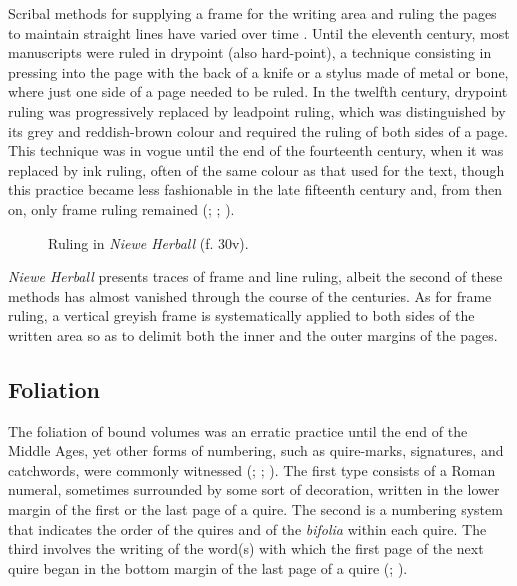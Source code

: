 \begin{paper}
Scribal methods for supplying a frame for the writing area and ruling
the pages to maintain straight lines have varied over time \mancite\citep[6]{petti_english_1977}. Until the eleventh century, most manuscripts were ruled in drypoint
(also hard-point), a technique consisting in pressing into the page with
the back of a knife or a stylus made of metal or bone, where just one
side of a page needed to be ruled. In the twelfth century, drypoint
ruling was progressively replaced by leadpoint ruling, which was
distinguished by its grey and reddish-brown colour and required the
ruling of both sides of a page. This technique was in vogue until the
end of the fourteenth century, when it was replaced by ink ruling, often
of the same colour as that used for the text, though this practice
became less fashionable in the late fifteenth century and, from then on,
only frame ruling remained (\cite[23]{de_hamel_scribes_1992}; \cite[16--17]{clemens_introduction_2007}; \cite{calle-martin_exploring_nodate}).
\begin{figure}
    \centering
    \caption{Ruling in \emph{Niewe Herball} (f. 30v).}
    \label{fig:lorente9}
\end{figure}
\emph{Niewe Herball} presents traces of frame and line ruling, albeit
the second of these methods has almost vanished through the course of
the centuries. As for frame ruling, a vertical greyish
frame is systematically applied to both sides of the written area so as
to delimit both the inner and the outer margins of the pages.

\subsection{Foliation}\label{sec:foliation}

The foliation of bound volumes was an erratic practice until the end of
the Middle Ages, yet other forms of numbering, such as quire-marks,
signatures, and catchwords, were commonly witnessed (\cite[6]{petti_english_1977};
\cite[33--34]{derolez_palaeography_2003}; \cite[5]{romero-barranco_late_2015}). The first type consists
of a Roman numeral, sometimes surrounded by some sort of decoration,
written in the lower margin of the first or the last page of a quire.
The second is a numbering system that indicates the order of
the quires and of the \emph{bifolia} within each quire. The third
involves the writing of the word(s) with which the first page of the next quire began in the bottom margin of the last page of a quire
 (\cite[33--34]{derolez_palaeography_2003}; \cite[49]{clemens_introduction_2007}).


\end{paper}
